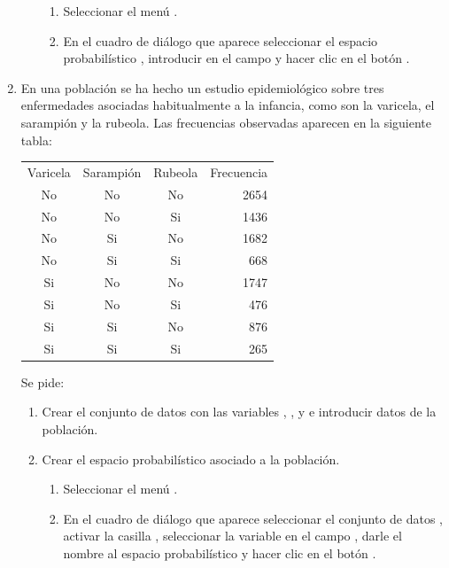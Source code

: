 \begin{enumerate}[leftmargin=*]
\begin{enumerate}
\begin{indicacion}
\begin{enumerate}
\item Seleccionar el menú .
\item En el cuadro de diálogo que aparece seleccionar el espacio probabilístico , introducir
 en el campo  y hacer clic en el botón .
\end{enumerate}
\end{indicacion}
\end{enumerate}


\item En una población se ha hecho un estudio epidemiológico sobre tres enfermedades asociadas habitualmente a la infancia, como son la
varicela, el sarampión y la rubeola.
Las frecuencias observadas aparecen en la siguiente tabla:
\begin{center}
\begin{tabular}{cccr}
\hline
Varicela & Sarampión & Rubeola & Frecuencia\\
No & No & No & 2654\\
No & No & Si & 1436\\
No & Si & No & 1682\\
No & Si & Si & 668\\
Si & No & No & 1747\\
Si & No & Si & 476\\
Si & Si & No & 876\\
Si & Si & Si & 265\\
\hline
\end{tabular}
\end{center}

Se pide:
\begin{enumerate}
\item Crear el conjunto de datos  con las variables , ,
 y  e introducir datos de la población.

\item Crear el espacio probabilístico asociado a la población.
\begin{indicacion}
\begin{enumerate}
\item Seleccionar el menú .
\item En el cuadro de diálogo que aparece seleccionar el conjunto de datos , activar la casilla
, seleccionar la variable  en el campo , darle el nombre
 al espacio probabilístico y hacer clic en el botón .
\end{enumerate}
\end{indicacion}  


\end{enumerate}
\end{enumerate}
